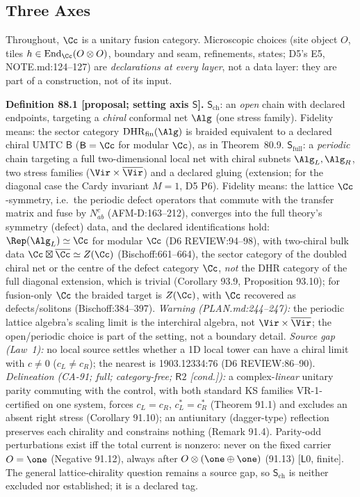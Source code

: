 \subsection{Three Axes}

Throughout, \(\Cc\) is a unitary fusion category.  Microscopic choices (site object \(O\), tiles \(h\in\operatorname{End}_\Cc
(O\otimes O)\), boundary and seam, refinements, states; D5's E5, NOTE.md:124--127) are \emph{declarations at every
layer}, not a data layer: they are part of a construction, not of its input.

\textbf{Definition 88.1 [proposal; setting axis \(\mathsf S\)].}
\(\mathsf S_{\mathrm{ch}}\): an \emph{open} chain with declared endpoints, targeting a \emph{chiral} conformal net \(\Alg\)
(one stress family).  Fidelity means: the sector category \(\mathrm{DHR}_{\mathrm{fin}}(\Alg)\) is braided equivalent to a
declared chiral UMTC \(\mathsf B\) (\(\mathsf B=\Cc\) for modular \(\Cc\)), as in Theorem~80.9.
\(\mathsf S_{\mathrm{full}}\): a \emph{periodic} chain targeting a full two-dimensional local net with chiral subnets
\(\Alg_L,\Alg_R\), two stress families (\(\Vir\times\overline{\Vir}\)) and a declared gluing (extension; for the diagonal
case the Cardy invariant \(M=1\), D5 P6).  Fidelity means: the lattice \(\Cc\)-symmetry, i.e.\ the periodic defect
operators that commute with the transfer matrix and fuse by \(N_{ab}^c\) (AFM-D:163--212), converges into the full
theory's symmetry (defect) data, and the declared identifications hold: \(\Rep(\Alg_L)\simeq\Cc\) for modular \(\Cc\) (D6
REVIEW:94--98), with two-chiral bulk data \(\Cc\boxtimes\overline{\Cc}\simeq Z(\Cc)\) (Bischoff:661--664), the sector category of the
doubled chiral net or the centre of the defect category \(\Cc\), \emph{not} the DHR category of the full diagonal extension,
which is trivial (Corollary 93.9, Proposition 93.10); for fusion-only
\(\Cc\) the braided target is \(Z(\Cc)\), with \(\Cc\) recovered as defects/solitons (Bischoff:384--397).
\emph{Warning (PLAN.md:244--247):} the periodic lattice algebra's scaling limit is the interchiral algebra, not
\(\Vir\times\overline{\Vir}\); the open/periodic choice is part of the setting, not a boundary detail.
\emph{Source gap (Law~1):} no local source settles whether a 1D local tower can have a chiral limit with \(c\neq0\)
(\(c_L\neq c_R\)); the nearest is 1903.12334:76 (D6 REVIEW:86--90).  \emph{Delineation (CA-91; full; category-free;
\(\mathsf R2\) [cond.]):} a complex-\emph{linear} unitary parity commuting with the control, with both standard KS families
VR-1-certified on one system, forces \(c_L=c_R\), \(c^*_L=c^*_R\) (Theorem 91.1) and excludes an absent right stress
(Corollary 91.10); an antiunitary (dagger-type) reflection preserves each chirality and constrains nothing (Remark 91.4).
Parity-odd perturbations exist iff the total current is nonzero: never on the fixed carrier \(O=\one\) (Negative 91.12),
always after \(O\otimes(\one\oplus\one)\) (91.13) [\(\mathsf L0\), finite].  The general lattice-chirality question remains a
source gap, so \(\mathsf S_{\mathrm{ch}}\) is neither excluded nor established; it is a declared tag.

